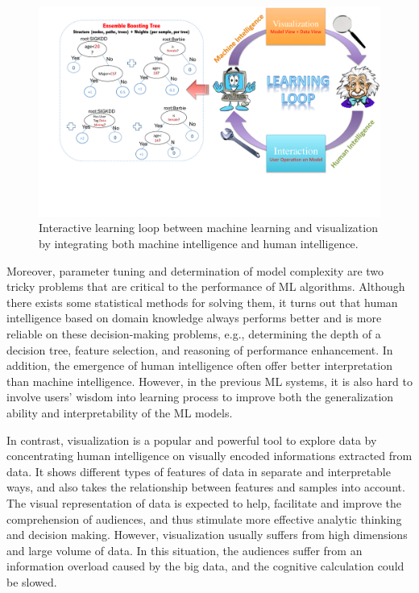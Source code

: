 \documentclass{chi2009}
\begin{document}
\begin{figure}[tH!]
\begin{center}
 \includegraphics[width=1\linewidth]{loop.pdf}
\end{center}
   \caption{Interactive learning loop between machine learning and visualization by integrating both machine intelligence and human intelligence.}
\label{fig:system}
\end{figure} 

Moreover, parameter tuning and determination of model complexity are two tricky problems that are critical to the performance of ML algorithms. Although there exists some statistical methods for solving them, it turns out that human intelligence based on domain knowledge always performs better and is more reliable on these decision-making problems, e.g., determining the depth of a decision tree, feature selection, and reasoning of performance enhancement. In addition, the emergence of human intelligence often offer better interpretation than machine intelligence. However, in the previous ML systems, it is also hard to involve users’ wisdom into learning process to improve both the generalization ability and interpretability of the ML models. 

In contrast, visualization \cite{visual} is a popular and powerful tool to explore data by concentrating human intelligence on visually encoded informations extracted from data. It shows different types of features of data in separate and interpretable ways, and also takes the relationship between features and samples into account. The visual representation of data is expected to help, facilitate and improve the comprehension of audiences, and thus stimulate more effective analytic thinking and decision making. However, visualization usually suffers from high dimensions and large volume of data. In this situation, the audiences suffer from an information overload caused by the big data, and the cognitive calculation could be slowed.
\end{document}
